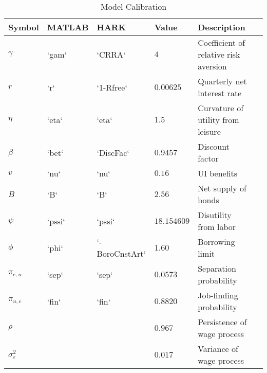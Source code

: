 \begin{table}[h]
  \centering
\renewcommand{\arraystretch}{1.5}
\caption{Model Calibration}
\label{tab:Calibration}
\begin{tabular}{llllll}
	\hline
	\textbf{Symbol} & \textbf{MATLAB} & \textbf{HARK}& \textbf{Value} & \textbf{Description}\\ \hline
$\gamma$  &   `gam`   & `CRRA`     & $4$ & Coefficient of relative risk aversion&  \\ \hline
$r$         &`r`     &  `1-Rfree`            & $0.00625$& Quarterly net interest rate& \\ \hline
$\eta$    & `eta`     &  `eta`    & $1.5$  & Curvature of utility from leisure&  \\ \hline
$\beta$   & `bet`     & `DiscFac`     & $0.9457$               & Discount factor&       \\ \hline
$v$ & `nu` & `nu` & $0.16$ & UI benefits& \\ \hline
$B$ & `B` & `B` & $2.56$ & Net supply of bonds& \\ \hline
$\psi$    & `pssi`    &  `pssi`    & $18.154609$         & Disutility from labor& \\ \hline
$\phi$      & `phi` &  `-BoroCnstArt`       & $1.60$ & Borrowing limit&\\ \hline
$\pi_{e,u}$ & `sep` &   `sep`     & $0.0573$            & Separation probability&\\ \hline
$\pi_{u,e}$ & `fin` &    `fin`     & $0.8820$    & Job-finding probability&  \\ \hline
$\rho$    &           &      & $0.967$                                  & Persistence of wage process& \\ \hline
$\sigma^2_\varepsilon$&&     & $0.017$& Variance of wage process& \\ \hline

\end{tabular}
\end{table}
